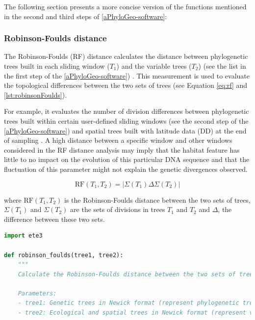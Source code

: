 {The following section presents a more concise version of the functions mentioned in the second and third steps of \autoref{aPhyloGeo-software}:

\subsubsection{Robinson-Foulds distance}\label{RF}
The Robinson-Foulds (RF) distance calculates the distance between phylogenetic trees built in each sliding window ($T_1$) and the variable trees ($T_2$) (see the list in the first step of the \autoref{aPhyloGeo-software}) \citep{tahiri2018new, koshkarov_phylogeography_2022}. This measurement is used to evaluate the topological differences between the two sets of trees (see Equation \eqref{eq:rf} and \autoref{lst:robinsonFoulds}).

For example, it evaluates the number of division differences between phylogenetic trees built within certain user-defined sliding windows (see the second step of the \autoref{aPhyloGeo-software}) and spatial trees built with latitude data (DD) at the end of sampling \citep{robinson_comparison_1981}. A high distance between a specific window and other windows considered in the RF distance analysis may imply that the habitat feature has little to no impact on the evolution of this particular DNA sequence and that the fluctuation of this parameter might not explain the genetic divergences observed.

\begin{equation}\label{eq:rf}
    \text{RF}(T_1, T_2) = | \Sigma(T_1) \Delta \Sigma(T_2) |
\end{equation}

where $\text{RF}(T_1, T_2)$ is the Robinson-Foulds distance between the two sets of trees, $\Sigma(T_1)$ and $\Sigma(T_2)$ are the sets of divisions in trees $T_1$ and $T_2$ and $ \Delta $, the difference between these two sets.

\begin{lstlisting}[label=lst:robinsonFoulds,language=Python,caption=Python script for calculating the Robinson-Foulds Distance using the ete3 package in the aPhyloGeo package.]
import ete3

def robinson_foulds(tree1, tree2):
    """
    Calculate the Robinson-Foulds distance between the two sets of trees.

    Parameters:
    - tree1: Genetic trees in Newick format (represent phylogenetic trees in text form).
    - tree2: Ecological and spatial trees in Newick format (represent variables trees in text form).


\end{lstlisting}}
